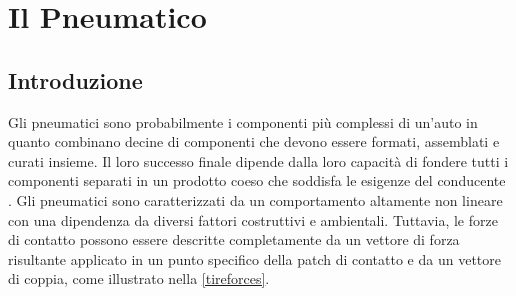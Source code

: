 \chapter{Il Pneumatico}
\label{Pneumatico}
%
\section{Introduzione}
Gli pneumatici sono probabilmente i componenti più complessi di un'auto in quanto combinano decine di componenti che devono essere formati, assemblati e curati insieme. Il loro successo finale dipende dalla loro capacità di fondere tutti i componenti separati in un prodotto coeso che soddisfa le esigenze del conducente \cite{rill}. Gli pneumatici sono caratterizzati da un comportamento altamente non lineare con una dipendenza da diversi fattori costruttivi e ambientali. Tuttavia, le forze di contatto possono essere descritte completamente da un vettore di forza risultante applicato in un punto specifico della patch di contatto e da un vettore di coppia, come illustrato nella \figurename{  \ref{tireforces}}.

